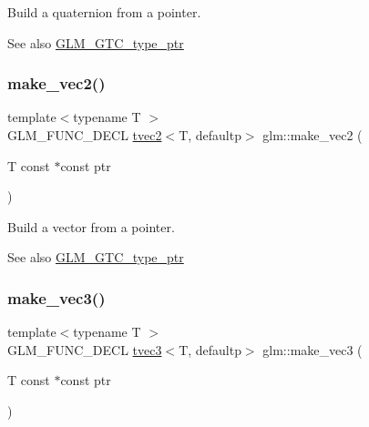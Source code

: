 Build a quaternion from a pointer. \begin{DoxySeeAlso}{See also}
\hyperlink{group__gtc__type__ptr}{G\+L\+M\+\_\+\+G\+T\+C\+\_\+type\+\_\+ptr} 
\end{DoxySeeAlso}
\mbox{\label{group__gtc__type__ptr_ga5f7393c30970c5949be13ceb525093a6}} 
\subsubsection{\texorpdfstring{make\+\_\+vec2()}{make\_vec2()}}
{\footnotesize\ttfamily template$<$typename T $>$ \\
G\+L\+M\+\_\+\+F\+U\+N\+C\+\_\+\+D\+E\+CL \hyperlink{structglm_1_1tvec2}{tvec2}$<$T, defaultp$>$ glm\+::make\+\_\+vec2 (\begin{DoxyParamCaption}\item[{T const $\ast$const}]{ptr }\end{DoxyParamCaption})}

Build a vector from a pointer. \begin{DoxySeeAlso}{See also}
\hyperlink{group__gtc__type__ptr}{G\+L\+M\+\_\+\+G\+T\+C\+\_\+type\+\_\+ptr} 
\end{DoxySeeAlso}
\mbox{\label{group__gtc__type__ptr_ga86f4bc63570db86346db2e567fb760f6}} 
\subsubsection{\texorpdfstring{make\+\_\+vec3()}{make\_vec3()}}
{\footnotesize\ttfamily template$<$typename T $>$ \\
G\+L\+M\+\_\+\+F\+U\+N\+C\+\_\+\+D\+E\+CL \hyperlink{structglm_1_1tvec3}{tvec3}$<$T, defaultp$>$ glm\+::make\+\_\+vec3 (\begin{DoxyParamCaption}\item[{T const $\ast$const}]{ptr }\end{DoxyParamCaption})}

